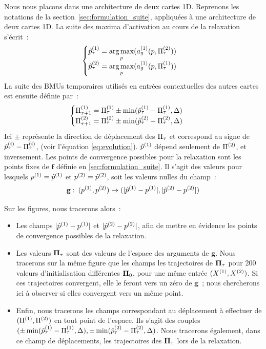 \documentclass[../main]{subfiles}
\begin{document}
Nous nous placons dans une architecture de deux cartes 1D.
Reprenons les notations de la section~\ref{sec:formulation_suite}, appliquées à une architecture de deux cartes 1D. La suite des maxima d'activation au cours de la relaxation s'écrit~:
\begin{equation*}
	\begin{cases}
	\hat{p}^{({1})}_\tau = \operatorname*{arg\,max}\limits_p(a_g^{({1})}(p, \Pi^{({2})}_\tau))\\
	\hat{p}^{({2})}_\tau = \operatorname*{arg\,max}\limits_p(a_g^{({1})}(p, \Pi^{({1})}_\tau)) \\
	\end{cases}
	\end{equation*}
La suite des BMUs temporaires utilisés en entrées contextuelles des autres cartes est ensuite définie par~:
\begin{align*}
	&\begin{cases}
	\Pi^{({1})}_{\tau+1} = \Pi^{({1})}_\tau \pm \min(\hat{p}^{({1})}_\tau - \Pi^{({1})}_\tau, \Delta)  \\
	\Pi^{({2})}_{\tau+1} = \Pi^{({2})}_\tau \pm \min(\hat{p}^{({2})}_\tau - \Pi^{({2})}_\tau, \Delta) \\
	\end{cases}
	\end{align*}
Ici $\pm$ représente la direction de déplacement des $\Pi_\tau$ et correspond au signe de $\hat{p}^{({i})}_\tau - \Pi^{({i})}_\tau$, (voir l'équation \ref{eq:evolution}).
$\hat{p}^{({1})}$ dépend seulement de $\Pi^{({2})}$, et inversement.
Les points de convergence possibles pour la relaxation sont les points fixes de $\mathbf{f}$ définie en \ref{sec:formulation_suite}. Il s'agit des valeurs pour lesquels $p^{({1})} = \hat{p}^{({1})}$ et $p^{({2})} = \hat{p}^{({2})}$, soit les valeurs nulles du champ~:
\begin{equation} 
	\mathbf{g}:\: (p^{({1})}, p^{({2})}) \rightarrow (\lvert \hat{p}^{({1})} - p^{({1})} \rvert,  \lvert \hat{p}^{({2})} - p^{({2})} \rvert)
\end{equation}

Sur les figures, nous tracerons alors~:
\begin{itemize}
\item Les champs $\lvert \hat{p}^{({1})} - p^{({1})} \rvert$ et $\lvert \hat{p}^{({2})} - p^{({2})} \rvert$, afin de mettre en évidence les points de convergence possibles de la relaxation. 
\item Les valeurs $\mathbf{\Pi}_\tau$ sont des valeurs de l'espace des arguments de $\mathbf{g}$. Nous tracerons sur la même figure que les champs les trajectoires de $\mathbf{\Pi}_\tau$ pour 200 valeurs d'initialisation différentes $\mathbf{\Pi}_0$, pour une même entrée $(X^{({1})}, X^{({2})})$. Si ces trajectoires convergent, elle le feront vers un zéro de $\mathbf{g}$~; nous chercherons ici à observer si elles convergent vers un même point.
\item Enfin, nous tracerons les champs correspondant au déplacement à effectuer de $(\Pi^{({1})},\Pi^{({2})})$ en tout point de l'espace. Ils s'agit des couples $(\pm \min(\hat{p}^{({1})}_\tau - \Pi^{({1})}_\tau, \Delta), \pm \min(\hat{p}^{({2})}_\tau - \Pi^{({2})}_\tau, \Delta)$. Nous tracerons également, dans ce champ de déplacements, les trajectoires des $\mathbf{\Pi}_\tau$ lors de la relaxation.
\end{itemize}
\end{document}
